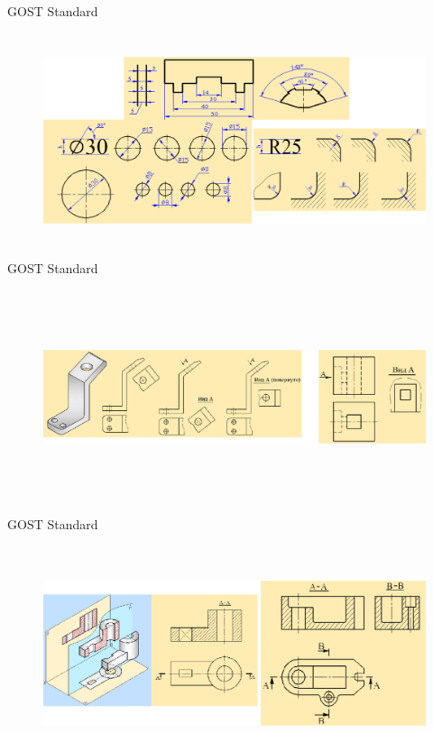\documentclass[aspectratio=169]{beamer}
\begin{document}
\begin{frame}[t]{GOST Standard}
    \framesubtitle{}
    \vspace{-0.6cm}
    \begin{figure}[H]
        \centering\includegraphics[height=6cm,width=1\textwidth,keepaspectratio]{resources/st2.png}
        \label{fig:resources/st2.png}
    \end{figure}
\end{frame}

\begin{frame}[t]{GOST Standard}
    \framesubtitle{}
    \vspace{-0.6cm}
    \begin{figure}[H]
        \centering\includegraphics[height=6cm,width=1\textwidth,keepaspectratio]{resources/st3.png}
        \label{fig:resources/st3.png}
    \end{figure}
\end{frame}

\begin{frame}[t]{GOST Standard}
    \framesubtitle{}
    \vspace{-0.6cm}
    \begin{figure}[H]
        \centering\includegraphics[height=6cm,width=1\textwidth,keepaspectratio]{resources/st4.png}
        \label{fig:resources/st4.png}
    \end{figure}
\end{frame}
\end{document}

